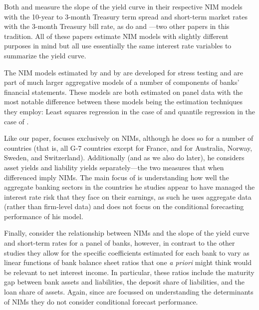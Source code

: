 \documentclass[11pt]{article}
\begin{document}
Both  and  measure the slope of the yield curve in their respective NIM models with the 10-year to 3-month Treasury term spread and short-term market rates with the 3-month Treasury bill rate, as do  and ---two other papers in this tradition.  All of these papers estimate NIM models with slightly different purposes in mind but all use essentially the same interest rate variables to summarize the yield curve.  

The NIM models estimated by  and by  are developed for stress testing and are part of much larger aggregative models of a number of components of banks' financial statements. These models are both estimated on panel data with the most notable difference between these models being the estimation techniques they employ: Least squares regression in the case of  and quantile regression in the case of . 

Like our paper,  focuses exclusively on NIMs, although he does so for a number of countries (that is, all G-7 countries except for France, and for Australia, Norway, Sweden, and Switzerland).  Additionally (and as we also do later), he considers asset yields and liability yields separately---the two measures that when differenced imply NIMs.  The main focus of  is understanding how well the aggregate banking sectors in the countries he studies appear to have managed the interest rate risk that they face on their earnings, as such he uses aggregate data (rather than firm-level data) and does not focus on the conditional forecasting performance of his model.

Finally,  consider the relationship between NIMs and the slope of the yield curve and short-term rates for a panel of banks, however, in contrast to the other studies they allow for the specific coefficients estimated for each bank to vary as linear functions of bank balance sheet ratios that one \textit{a priori} might think would be relevant to net interest income.  In particular, these ratios include the maturity gap between bank assets and liabilities, the deposit share of liabilities, and the loan share of assets. Again, since  are focussed on understanding the determinants of NIMs they do not consider conditional forecast performance.
\end{document}

